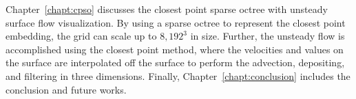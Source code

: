 Chapter~\ref{chapt:cpso} discusses the closest point sparse octree with unsteady surface flow visualization. By using a sparse octree to represent the closest point embedding, the grid can scale up to $8,192^3$ in size. Further, the unsteady flow is accomplished using the closest point method, where the velocities and values on the surface are interpolated off the surface to perform the advection, depositing, and filtering in three dimensions. Finally, Chapter~\ref{chapt:conclusion} includes the conclusion and future works.

